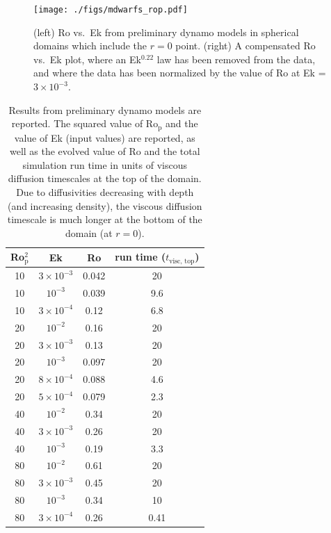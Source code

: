 \documentclass[aps, pre, onecolumn, nofootinbib, notitlepage, groupedaddress, amsfonts, amssymb, amsmath, longbibliography, superscriptaddress]{revtex4-1}
\begin{document}
\begin{enumerate}
\begin{figure}[ht!]
\texttt{[image: ./figs/mdwarfs\_rop.pdf]}
\caption{ (left) Ro vs.~Ek from preliminary dynamo models in spherical domains which include the $r = 0$ point.
		  (right) A compensated Ro vs.~Ek plot, where an Ek$^{0.22}$ law has been removed from the data, and where the data has been normalized by the value of Ro at Ek = $3 \times 10^{-3}$.
	\label{fig:mdwarfs_rop} }
\vspace{-0.75cm}
\end{figure}



\begin{table}[htb]
    \caption[Preliminary Rossby numbers in Mdwarf simulations.]{
	Results from preliminary dynamo models are reported.
	The squared value of Ro$_\text{p}$ and the value of Ek (input values) are reported, as well as the evolved value of Ro and the total simulation run time in units of viscous diffusion timescales at the top of the domain.
	Due to diffusivities decreasing with depth (and increasing density), the viscous diffusion timescale is much longer at the bottom of the domain (at $r = 0$).
	}
    \begin{center}
    \begin{tabular}{c c c c} \hline
	Ro$_\text{p}^2$ & Ek &  Ro & run time ($t_{\text{visc, top}}$) \\
	\hline
	10	&	$3 \times 10^{-3}$	& 0.042 & 	20	\\
	10	&	$10^{-3}$			& 0.039	&	9.6 \\
	10 	&	$3 \times 10^{-4}$	& 0.12	&	6.8 \\
	20	&	$10^{-2}$			& 0.16	&	20 \\
	20	&	$3 \times 10^{-3}$	& 0.13	&	20 \\
	20	&	$10^{-3}$			& 0.097 &	20 \\
	20 	&	$8 \times 10^{-4}$	& 0.088	&	4.6 \\
	20	&	$5 \times 10^{-4}$	& 0.079 &	2.3 \\
	40	&	$10^{-2}$			& 0.34	&	20  \\
	40	&	$3 \times 10^{-3}$	& 0.26	&	20  \\
	40	&	$10^{-3}$			& 0.19	&	3.3 \\
	80	&	$10^{-2}$			& 0.61	&	20  \\
	80	&	$3 \times 10^{-3}$	& 0.45	&	20  \\
	80	&	$10^{-3}$			& 0.34	&	10	\\
	80	&	$3 \times 10^{-4}$	& 0.26	&	0.41 \\
	\end{tabular}
\end{center}
\label{table:rop_spheres}
\end{table}



\end{enumerate}
\end{document}
